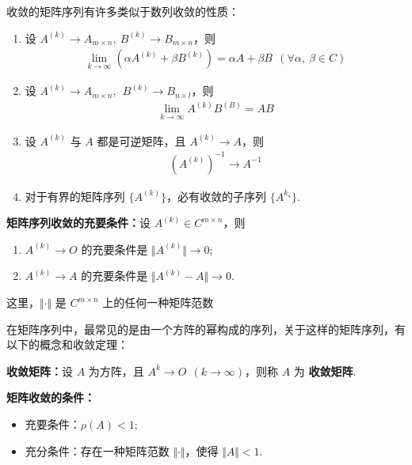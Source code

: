             \par 收敛的矩阵序列有许多类似于数列收敛的性质：
            \begin{enumerate}
                \item 设 $A^{(k)} \rightarrow A_{m \times n}, \ B^{(k)} \rightarrow B_{m \times n}$，则 
                    \begin{align*}
                        \lim_{k \rightarrow \infty}(\alpha A^{(k)} + \beta B^{(k)}) = \alpha A + \beta B \ \ (\forall \alpha, \ \beta \in C)
                    \end{align*}
                \item 设 $A^{(k)} \rightarrow A_{m \times n}, \ \ B^{(k)} \rightarrow B_{n \times l}$，则 
                    \begin{align*}
                        \lim_{k \rightarrow \infty} A^{(k)}B^{(B)} = AB 
                    \end{align*}
                \item 设 $A^{(k)}$ 与 $A$ 都是可逆矩阵，且 $A^{(k)} \rightarrow A$，则 
                    \begin{align*}
                        (A^{(k)})^{-1} \rightarrow A^{-1} 
                    \end{align*}
                \item 对于有界的矩阵序列 $\{A^{(k)}\}$，必有收敛的子序列 $\{A^{k_s}\}$.
            \end{enumerate}

            \par \textbf{矩阵序列收敛的充要条件：}设 $A^{(k)} \in C^{m \times n}$，则
            \begin{enumerate}
                \item $A^{(k)} \rightarrow O$ 的充要条件是 $\Vert A^{(k)} \Vert \rightarrow 0$;
                \item $A^{(k)} \rightarrow A$ 的充要条件是 $\Vert A^{(k)} - A \Vert \rightarrow 0$.
            \end{enumerate}
            这里，$\Vert \cdot \Vert$ 是 $C^{m \times n}$ 上的任何一种矩阵范数
            \\
            \par 在矩阵序列中，最常见的是由一个方阵的幂构成的序列，关于这样的矩阵序列，有以下的概念和收敛定理：
            \par \textbf{收敛矩阵：}设 $A$ 为方阵，且 $A^k \rightarrow O \ \ (k \rightarrow \infty)$，则称 $A$ 为 \textbf{收敛矩阵}.
            \par \textbf{矩阵收敛的条件：}
            \begin{itemize}
                \item 充要条件：$\rho(A) < 1$;
                \item 充分条件：存在一种矩阵范数 $\Vert \cdot \Vert$，使得 $\Vert A \Vert < 1$.
            \end{itemize}

